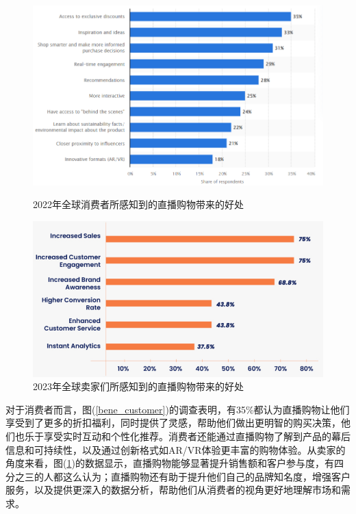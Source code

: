 \documentclass[12pt]{ctexart}
\begin{document}
\begin{figure}[htbp!]
    \begin{minipage}[t]{0.457\textwidth}
        \centering
        \includegraphics[width=\textwidth]{Images/19.png}
        \caption{2022年全球消费者所感知到的直播购物带来的好处 \cite{23}}
        \label{bene_customer}
    \end{minipage}
    \hfill
    \begin{minipage}[t]{0.53\textwidth}
        \centering
        \includegraphics[width=\textwidth]{Images/20.png}
        \caption{2023年全球卖家们所感知到的直播购物带来的好处 \cite{24}}
        \label{bene_seller}
    \end{minipage}
\end{figure}

对于消费者而言，图(\ref{bene_customer})的调查表明，有35\%都认为直播购物让他们享受到了更多的折扣福利，同时提供了灵感，帮助他们做出更明智的购买决策，他们也乐于享受实时互动和个性化推荐。消费者还能通过直播购物了解到产品的幕后信息和可持续性，以及通过创新格式如AR/VR体验更丰富的购物体验。从卖家的角度来看，图(\ref{bene_seller})的数据显示，直播购物能够显著提升销售额和客户参与度，有四分之三的人都这么认为；直播购物还有助于提升他们自己的品牌知名度，增强客户服务，以及提供更深入的数据分析，帮助他们从消费者的视角更好地理解市场和需求。
\end{document}
